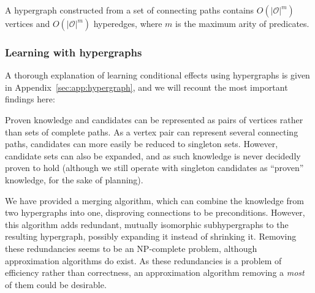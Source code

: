 \documentclass[\master/Master.tex]{subfiles}
\begin{document}
A hypergraph constructed from a set of connecting paths contains $O\left(|\mathcal{O}|^m\right)$ vertices and $O\left( |\mathcal{O}|^m\right)$ hyperedges, where $m$ is the maximum arity of predicates. 

\subsubsection*{Learning with hypergraphs}
A thorough explanation of learning conditional effects using hypergraphs is given in Appendix~\ref{sec:app:hypergraph}, and we will recount the most important findings here:

Proven knowledge and candidates can be represented as pairs of vertices rather than sets of complete paths. As a vertex pair can represent several connecting paths, candidates can more easily be reduced to singleton sets. However, candidate sets can also be expanded, and as such knowledge is never decidedly proven to hold (although we still operate with singleton candidates as ``proven'' knowledge, for the sake of planning).

We have provided a merging algorithm, which can combine the knowledge from two hypergraphs into one, disproving connections to be preconditions. However, this algorithm adds redundant, mutually isomorphic subhypergraphs to the resulting hypergraph, possibly expanding it instead of shrinking it. Removing these redundancies seems to be an NP-complete problem, although approximation algorithms do exist. As these redundancies is a problem of efficiency rather than correctness, an approximation algorithm removing a \emph{most} of them could be desirable.
\end{document}
